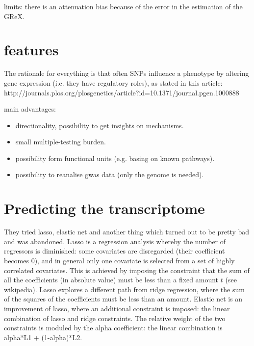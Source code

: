 \documentclass[../main.tex]{subfiles}
\begin{document}
limits: there is an attenuation bias because of the error in the estimation of
the GReX.

\section{features}

The rationale for everything is that often SNPs influence a phenotype by
altering gene expression (i.e. they have regulatory roles), as stated in this
article:
http://journals.plos.org/plosgenetics/article?id=10.1371/journal.pgen.1000888

main advantages:

\begin{itemize}
\item directionality, possibility to get insights on mechanisms.
\item small multiple-testing burden.
\item possibility form functional units (e.g. basing on known pathways).
\item possibility to reanalise gwas data (only the genome is needed).
\end{itemize}





\section{Predicting the transcriptome}

They tried lasso, elastic net and another thing which turned out to be 
pretty bad and was abandoned. Lasso is a regression analysis whereby the 
number of regressors is diminished: some covariates are disregarded 
(their coefficient becomes 0), and in general only one covariate is 
selected from a set of highly correlated covariates. This is achieved by 
imposing the constraint that the sum of all the coefficients (in 
absolute value) must be less than a fixed amount $t$ (see wikipedia). 
Lasso explores a different path from ridge regression, where the sum of 
the squares of the coefficients must be less than an amount. Elastic net 
is an improvement of lasso, where an additional constraint is imposed: 
the linear combination of lasso and ridge constraints. The relative 
weight of the two constraints is moduled by the alpha coefficient: the 
linear combination is alpha*L1 + (1-alpha)*L2.
\end{document}
